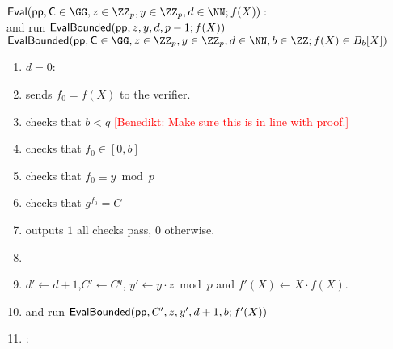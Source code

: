 \documentclass{article}
\theoremstyle{definition}
\newcommand{\benedikt}[1]{{\textcolor{red}{[Benedikt: #1]}}}
\newcommand{\benedikt}[1]{}
\begin{document}
\begin{mdframed}
\begin{minipage}{\textwidth}
			$\pro{Eval}(\crs, \gr{C}\in \GG, z\in \ZZ_p, y\in \ZZ_p, d \in \NN; f(X)) :$ \\
			 \prover and \verifier run $\textsf{{EvalBounded}}(\textsf{pp},z,y,d,p-1;f(X))$\\
		$\pro{EvalBounded}(\crs,\gr{C}\in \GG,z\in \ZZ_p,y\in \ZZ_p,d\in \NN,b\in \ZZ;f(X)\in B_{b}[X])$
	    \begin{enumerate}[nolistsep]
        \item \pcif $d=0$:
        \item \pcind[1] \prover sends $f_0=f(X)$ to the verifier. 
        \item \pcind[1] \verifier checks that $b< q$ \benedikt{Make sure this is in line with proof.}
        \item \pcind[1] \verifier checks that $f_0 \in [0,b]$
          \item \pcind[1] \verifier checks that $f_0\equiv y \bmod p$
                \item \pcind[1] \verifier checks that $g^{f_0}=C$
\item \pcind[1] \verifier outputs $1$ \pcif all checks pass, $0$ otherwise.
          \item {}
         \item \pcind[1]  $d'\gets d+1$,$ C'\gets C^q$, $y'\gets y\cdot z \bmod p$ and $f'(X)\gets X \cdot f(X)$.
         \item \pcind[1] \prover and \verifier run $\textsf{{EvalBounded}}(\textsf{pp},C',z,y',d+1,b;f'(X))$
        \item \pcelse: 
       

\end{enumerate}
\end{minipage}
\end{mdframed}
\end{document}
